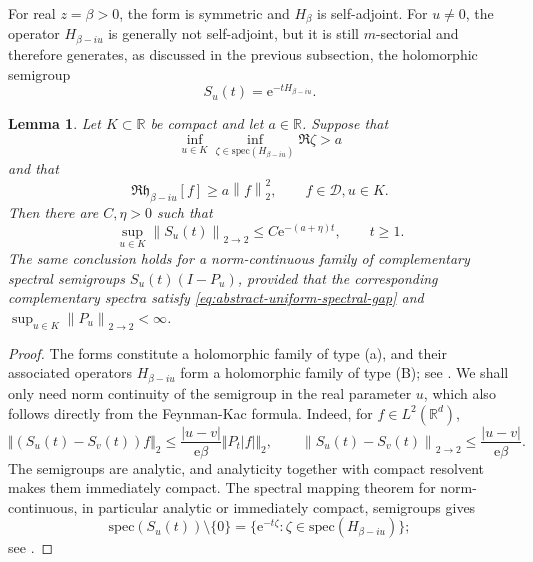 \documentclass[11pt,reqno]{amsart}
\newtheorem{lemma}[theorem]{Lemma}
\theoremstyle{definition}
\numberwithin{equation}{section}
\newcommand{\<}{\langle}
\renewcommand{\>}{\rangle}
\def\spec{{\rm spec}}
\def\R{{\mathbb R}}
\def\cD{{\cal D}}
\def\spec{{\mathrm {spec}}}
\def\cD{{{\mathcal D}}}
\def\lt{\left}
\def\rt{\right}
\newcommand{\norm}[1]{{\lt\|#1\rt\|}}
\begin{document}
\begin{appendix}
For real $z=\beta>0$, the form is symmetric and $H_\beta$ is self-adjoint.
For $u\neq0$, the operator $H_{\beta-iu}$ is generally not self-adjoint, but
it is still $m$-sectorial and therefore generates, as discussed in the previous subsection, the holomorphic semigroup
\[
      S_u(t)=\mathrm e^{-tH_{\beta-iu}}.
\]

\begin{lemma}
\label{lem:spectral-to-semigroup}
Let $K\subset\R$ be compact and let $a\in\R$.  Suppose that
\begin{equation}
 \inf_{u\in K}\inf_{\zeta\in\spec(H_{\beta-iu})}\Re\zeta>a
\label{eq:abstract-uniform-spectral-gap}
\end{equation}
and that
\begin{equation}
 \Re\mathfrak h_{\beta-iu}[f]
 \geq a\norm f_2^2,
 \qquad f\in\cD, u\in K.
 \label{eq:numerical-lower-bound}
\end{equation}
Then there are $C,\eta>0$ such that
\[
 \sup_{u\in K}\norm{S_u(t)}_{2\to2}
 \leq C \mathrm e^{-(a+\eta)t},
 \qquad t\geq1.
\]
The same conclusion holds for a norm-continuous family of complementary
spectral semigroups $S_u(t)(I-P_u)$, provided that the corresponding
complementary spectra satisfy \eqref{eq:abstract-uniform-spectral-gap} and
$\sup_{u\in K}\norm{P_u}_{2 \to 2}<\infty$.
\end{lemma}

\begin{proof}
The forms constitute a holomorphic family of type (a), and their associated
operators $H_{\beta-iu}$ form a holomorphic family of type (B); see
\cite[Chapter~VII, Section~4, especially Theorem~4.2]{Kato}.  We shall only
need norm continuity of the semigroup in the real parameter $u$, which also
follows directly from the Feynman-Kac formula. Indeed, for $f\in L^2(\mathbb R^d)$,
\[
 \Vert (S_u(t)-S_v(t))f\Vert_2
 \leq \frac{|u-v|}{\mathrm e\beta}\Vert P_t|f|\Vert_2,
 \qquad
 \norm{S_u(t)-S_v(t)}_{2\to2}
 \leq\frac{|u-v|}{\mathrm e\beta}.
\]
The semigroups are analytic, and analyticity together with compact resolvent
makes them immediately compact.  The spectral mapping theorem for 
norm-continuous, in particular analytic or immediately compact, semigroups
gives
\begin{equation}
 \spec(S_u(t))\setminus\{0\}
 =\{\mathrm e^{-t\zeta}:\zeta\in\spec(H_{\beta-iu})\};
 \label{eq:spectral-mapping}
\end{equation}
see \cite[Chapter~IV, Sections~2-3]{EngelNagelSemigroups}.


\end{proof}
\end{appendix}
\end{document}
